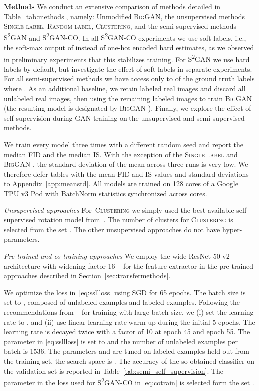 \documentclass{article}
\newcommand{\cotrainSS}{\textsc{S\textsuperscript{2}GAN-CO}}
\newcommand{\tranSS}{\textsc{S\textsuperscript{2}GAN}}
\newcommand{\tranC}{\textsc{Clustering}}
\newcommand{\slabels}{\textsc{Single label}}
\newcommand{\rlabels}{\textsc{Random label}}
\newcommand{\biggan}{\textsc{BigGAN}}
\begin{document}
\textbf{Methods}\quad
We conduct an extensive comparison of methods detailed in Table~\ref{tab:methods}, namely: Unmodified \biggan, the unsupervised methods \slabels{}, \rlabels{}, \tranC{}, and the semi-supervised methods \tranSS{} and \cotrainSS{}. In all \cotrainSS{} experiments we use soft labels, i.e., the soft-max output of  instead of one-hot encoded hard estimates, as we observed in preliminary experiments that this stabilizes training. For \tranSS{} we use hard labels by default, but investigate the effect of soft labels in separate experiments. For all semi-supervised methods we have access only to  of the ground truth labels where . As an additional baseline, we retain  labeled real images and discard all unlabeled real images, then using the remaining labeled images to train \biggan{} (the resulting model is designated by \biggan-). Finally, we explore the effect of self-supervision during GAN training on the unsupervised and semi-supervised methods. 

We train every model three times with a different random seed and report the median FID and the median IS. With the exception of the \slabels{} and \biggan-, the standard deviation of the mean across three runs is very low. We therefore defer tables with the mean FID and IS values and standard deviations to Appendix~\ref{app:meanstd}. All models are trained on 128 cores of a Google TPU v3 Pod with BatchNorm statistics synchronized across cores.


\emph{Unsupervised approaches} For~\tranC{} we simply used the best available self-supervised rotation model from~\citet{kolesnikov2019revisiting}. The number of clusters for \tranC{} is selected from the set . The other unsupervised approaches do not have hyper-parameters.


\emph{Pre-trained and co-training approaches}
We employ the wide ResNet-50 v2 architecture with widening factor 16 ~\cite{zagoruyko2016wide} for the feature extractor  in the pre-trained approaches described in Section~\ref{sec:transfermethods}. 

We optimize the loss in~\eqref{eq:ssllloss} using SGD for 65 epochs. The batch size is set to , composed of  unlabeled examples and  labeled examples. Following the recommendations from ~\citet{goyal2017accurate} for training with large batch size, we (i) set the learning rate to , and (ii) use linear learning rate warm-up during the initial 5 epochs. The learning rate is decayed twice with a factor of 10 at epoch 45 and epoch 55. The parameter  in \eqref{eq:ssllloss} is set to  and the number of unlabeled examples per batch  is 1536. The parameters  and  are tuned on  labeled examples held out from the training set, the search space is . The accuracy of the so-obtained classifier  on the \imagenet{} validation set is reported in Table~\ref{tab:semi_self_supervision}. The parameter  in the loss used for \cotrainSS{} in \eqref{eq:cotrain} is selected form the set .
\end{document}

